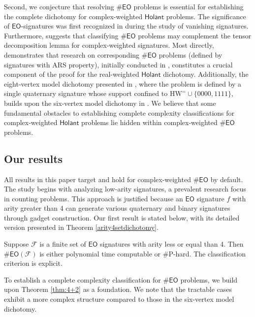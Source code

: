 \documentclass[a4paper,UKenglish,cleveref, autoref, thm-restate]{lipics-v2021}
\newcommand{\hol}[0]{\textsf{Holant}}
\newcommand{\eo}[0]{\textsf{EO}}
\newcommand{\eoe}[0]{\text{HW}^=}
\begin{document}
Second, we conjecture that resolving $\#\eo$ problems is essential for establishing the complete dichotomy for complex-weighted $\hol$ problems. The significance of $\eo$-signatures was first recognized in \cite{cai2013vanishing} during the study of vanishing signatures. Furthermore, \cite{lin2018holantnonnegative} suggests that classifying $\#\eo$ problems may complement the tensor decomposition lemma for complex-weighted signatures. Most directly, \cite{shao2020realholant} demonstrates that research on corresponding $\#\eo$ problems (defined by signatures with ARS property), initially conducted in \cite{cai2020beyond}, constitutes a crucial component of the proof for the real-weighted $\hol$ dichotomy. Additionally, the eight-vertex model dichotomy presented in \cite{caifu2023eightvertex}, where the problem is defined by a single quaternary signature whose support confined to $\eoe\cup\{0000,1111\}$, builds upon the six-vertex model dichotomy in \cite{cai2018complexity}. We believe that some fundamental obstacles to establishing complete complexity classifications for complex-weighted $\hol$ problems lie hidden within complex-weighted $\#\eo$ problems.

\subsection{Our results}\label{section:resulteasy}






All results in this paper target and hold for complex-weighted $\#\eo$ by default. The study begins with analyzing low-arity signatures, a prevalent research focus in counting problems. This approach is justified because an $\eo$ signature $f$ with arity greater than 4 can generate various quaternary and binary signatures through gadget construction.
Our first result is stated below, with its detailed version presented in Theorem \ref{arity4setdichotomy}.

\begin{theorem}\label{thm:4+2}
    Suppose $\mathcal{F}$ is a finite set of $\eo$ signatures with arity less or equal than 4. Then $\#\eo(\mathcal{F})$ is either polynomial time computable or \#P-hard. The classification criterion is explicit.
\end{theorem}

To establish a complete complexity classification for $\#\eo$ problems, we build upon Theorem \ref{thm:4+2} as a foundation. We note that the tractable cases exhibit a more complex structure compared to those in the six-vertex model dichotomy.
\end{document}
